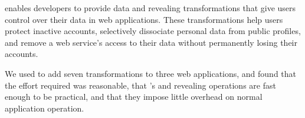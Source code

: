 %
\sys enables developers to provide data \xxing and revealing
transformations that give users control over their data in web applications.
%
These transformations help users protect inactive accounts, selectively dissociate
personal data from public profiles, and remove a web service's access to their
data without permanently losing their accounts.
%

%
We used \sys to add seven \xxing transformations to three web applications, and
found that the effort required was reasonable, that \sys's \xxing and
revealing operations are fast enough to be practical, and that they impose
little overhead on normal application operation.
%

%
%
